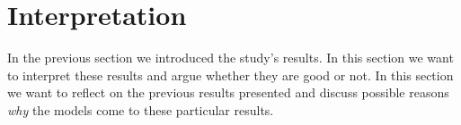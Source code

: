 \section{Interpretation}
\label{chp:study:sec:interpretation}
In the previous section we introduced the study's results.
In this section we want to interpret these results and argue whether they are good or not.
In this section we want to reflect on the previous results presented and discuss possible reasons \textit{why} the models come to these particular results.




